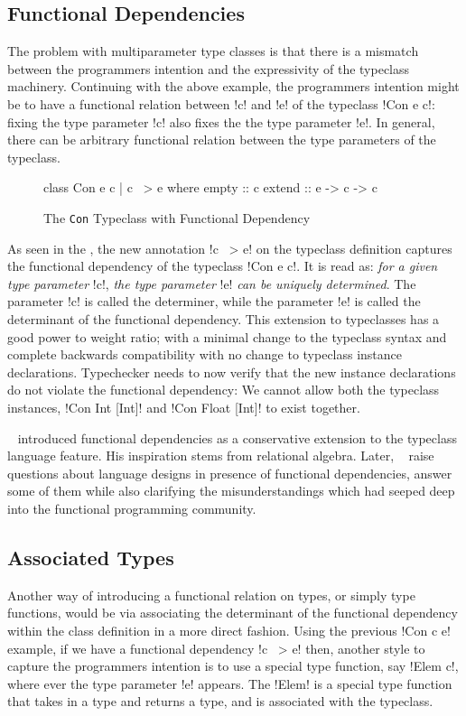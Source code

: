 \documentclass[screen,nonacm,manuscript,review]{acmart} %
\begin{document}
\subsection{Functional Dependencies}
The problem with multiparameter type classes is that there is a
mismatch between the programmers intention and the expressivity of the
typeclass machinery. Continuing with the above example, the
programmers intention might be to have a functional relation between !c! and
!e! of the typeclass !Con e c!: fixing the type
parameter !c! also fixes the the type parameter !e!. In general,
there can be arbitrary functional relation between the type parameters
of the typeclass.
\begin{figure}[ht]
\begin{CenteredBox}
\begin{code}
class Con e c | c ~> e where
  empty :: c
  extend :: e -> c -> c
\end{code}
\end{CenteredBox}
\caption[\lstinline{Con} typeclass]{The \lstinline{Con} Typeclass with Functional Dependency}
\label{fig:tc-collection-fd}
\end{figure}
As seen in the , the new annotation !c ~> e!
on the typeclass definition captures the functional dependency of the typeclass
!Con e c!. It is read as: \emph{for a given type parameter} !c!,
\emph{the type parameter} !e! \emph{can be uniquely
determined}. The parameter !c! is called the determiner, while
the parameter !e! is called the determinant of the
functional dependency. This extension to typeclasses has a good power
to weight ratio; with a minimal change to the typeclass syntax and
complete backwards compatibility with no change to typeclass instance declarations.
Typechecker needs to now verify that the new instance declarations do
not violate the functional dependency: We cannot allow both the typeclass instances,
!Con Int [Int]! and !Con Float [Int]! to exist together.

~\citet{jones_tcfd_2000} introduced functional dependencies as a
conservative extension to the typeclass language feature. His
inspiration stems from relational algebra. Later,
~\citet{jones_language_2008} raise questions about language designs in
presence of functional dependencies, answer some of them while also
clarifying the misunderstandings which had seeped deep into the
functional programming community.

\subsection{Associated Types}
Another way of introducing a functional relation on types, or simply
type functions, would be via associating the determinant of the
functional dependency within the class definition in a more direct fashion.
Using the previous !Con c e! example, if we have a functional
dependency !c ~> e! then, another style to capture the programmers
intention is to use a special type function, say !Elem c!, where ever
the type parameter !e! appears. The !Elem! is a special type function
that takes in a type and returns a type, and is associated with the
typeclass.
\end{document}
